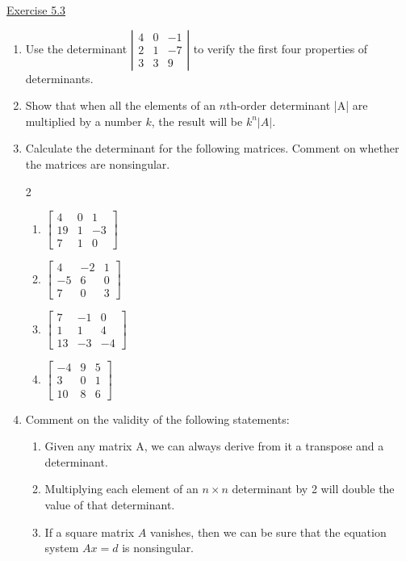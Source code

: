 \underline{Exercise 5.3}

\begin{enumerate}

\item[1.] Use the determinant $\left|\begin{array}{rrr}4 & 0 & -1 \\ 2 & 1 & -7 \\ 3 & 3 & 9\end{array}\right|$ to verify the first four properties of determinants.

\item[4.] Show that when all the elements of an $n$th-order determinant |A| are multiplied by a number $k$, the result will be $k^{n}|A|$.

\item[5.] Calculate the determinant for the following matrices. Comment on whether the matrices are nonsingular.
\begin{multicols}{2}
\begin{enumerate}
\item [(a)] $\left[\begin{array}{rrr}4 & 0 & 1 \\ 19 & 1 & -3 \\ 7 & 1 & 0\end{array}\right]$
\item [(b)] $\left[\begin{array}{rrr}4 & -2 & 1 \\ -5 & 6 & 0 \\ 7 & 0 & 3\end{array}\right]$
\item [(c)] $\left[\begin{array}{rrr}7 & -1 & 0 \\ 1 & 1 & 4 \\ 13 & -3 & -4\end{array}\right]$
\item [(d)] $\left[\begin{array}{rrr}-4 & 9 & 5 \\ 3 & 0 & 1 \\ 10 & 8 & 6\end{array}\right]$
\end{enumerate}
\end{multicols}

\item[8.] Comment on the validity of the following statements:
\begin{enumerate}
\item Given any matrix A, we can always derive from it a transpose and a determinant.
\item Multiplying each element of an $n \times n$ determinant by 2 will double the value of that determinant.
\item If a square matrix $A$ vanishes, then we can be sure that the equation system $A x=d$ is nonsingular.
\end{enumerate}
\end{enumerate}

